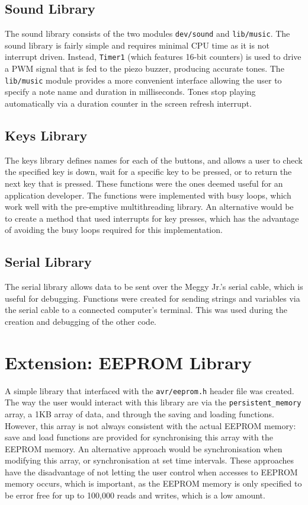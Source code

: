 \documentclass[a4paper,10pt]{article}
\begin{document}
\subsection*{Sound Library}
\label{sub:Sound Library}

The sound library consists of the two modules \texttt{dev/sound} and
\texttt{lib/music}. The sound library is fairly simple and requires minimal
CPU time as it is not interrupt driven. Instead, \texttt{Timer1} (which
features 16-bit counters) is used to drive a PWM signal that is fed to the
piezo buzzer, producing accurate tones. The \texttt{lib/music} module provides
a more convenient interface allowing the user to specify a note name and
duration in milliseconds. Tones stop playing automatically via a duration
counter in the screen refresh interrupt.

\subsection*{Keys Library}
The keys library defines names for each of the buttons, and allows a user to
check the specified key is down, wait for a specific key to be pressed, or to
return the next key that is pressed. These functions were the ones deemed
useful for an application developer.  The functions were implemented with busy
loops, which work well with the pre-emptive multithreading library. An
alternative would be to create a method that used interrupts for key presses,
which has the advantage of avoiding the busy loops required for this
implementation.

\subsection*{Serial Library}
The serial library allows data to be sent over the Meggy Jr.'s serial cable,
which is useful for debugging. Functions were created for sending strings and
variables via the serial cable to a connected computer's terminal. This was
used during the creation and debugging of the other code.

\section*{Extension: EEPROM Library}
A simple library that interfaced with the \texttt{avr/eeprom.h} header file
was created. The way the user would interact with this library are via the
\texttt{persistent\_memory} array, a 1KB array of data, and through the saving
and loading functions. However, this array is not always consistent with the
actual EEPROM memory: save and load functions are provided for synchronising
this array with the EEPROM memory. An alternative approach would be
synchronisation when modifying this array, or synchronisation at set time
intervals. These approaches have the disadvantage of not letting the user
control when accesses to EEPROM memory occurs, which is important, as the
EEPROM memory is only specified to be error free for up to 100,000 reads and
writes, which is a low amount.
\end{document}
